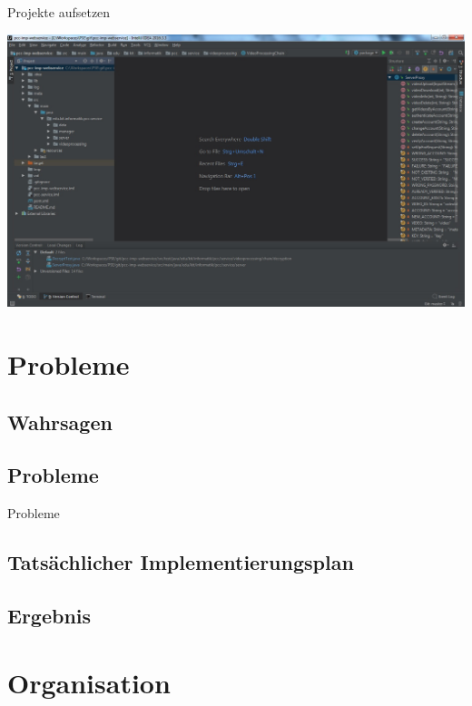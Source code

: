 \documentclass[19pt]{beamer}
\begin{document}
\begin{frame}{Projekte aufsetzen}
\begin{center}
\includegraphics[scale=0.3]{resources/Projekt.jpg}
\end{center}
\end{frame}

\section{Probleme}

\subsection{Wahrsagen}

\subsection{Probleme}
\begin{frame}{Probleme}

\end{frame}

\subsection{Tatsächlicher Implementierungsplan}

\subsection{Ergebnis}

\section{Organisation}
\end{document}
